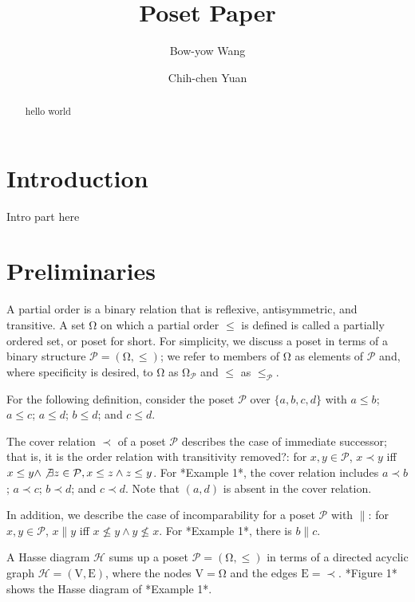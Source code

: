\documentclass{llncs}
\begin{document}
\title{Poset Paper}
\author{Bow-yow Wang \and Chih-chen Yuan}
\maketitle

\begin{abstract}
hello world
\end{abstract}

\section{Introduction}
Intro part here

\section{Preliminaries}

A partial order is a binary relation that is reflexive, antisymmetric, and transitive. A set $\mathrm{\Omega}$ on which a partial order $\leq$ is defined is called a partially ordered set, or poset for short. For simplicity, we discuss a poset in terms of a binary structure $\mathcal{P} = (\mathrm{\Omega}, \leq)$; we refer to members of $\mathrm{\Omega}$ as elements of $\mathcal{P}$ and, where specificity is desired, to $\mathrm{\Omega}$ as $\mathrm{\Omega}_{\mathcal{P}}$ and $\leq$ as $\leq_{\mathcal{P}}$.

\begin{example}
    For the following definition, consider the poset $\mathcal{P}$ over $\{a,b,c,d\}$ with $a \leq b$; $a \leq c$; $a \leq d$; $b \leq d$; and $c \leq d$.
\end{example}

The cover relation $\prec$ of a poset $\mathcal{P}$ describes the case of immediate successor; that is, it is the order relation with transitivity removed?: for $x, y \in \mathcal{P}$, $x \prec y$ iff $x \leq y \wedge \not\exists z \in \mathcal{P}, x \leq z \wedge z \leq y$. For *Example 1*, the cover relation includes $a \prec b$; $a \prec c$; $b \prec d$; and $c \prec d$. Note that $(a, d)$ is absent in the cover relation.

In addition, we describe the case of incomparability for a poset $\mathcal{P}$ with $\parallel$: for $x, y \in \mathcal{P}$, $x \parallel y$ iff $x \not\leq y \wedge y \not\leq x$. For *Example 1*, there is $b \parallel c$.

A Hasse diagram $\mathcal{H}$ sums up a poset $\mathcal{P} = (\mathrm{\Omega}, \leq)$ in terms of a directed acyclic graph $\mathcal{H} = (\mathrm{V},\mathrm{E})$, where the nodes $\mathrm{V} = \mathrm{\Omega}$ and the edges $\mathrm{E} = \prec$. *Figure 1* shows the Hasse diagram of *Example 1*.
\end{document}
